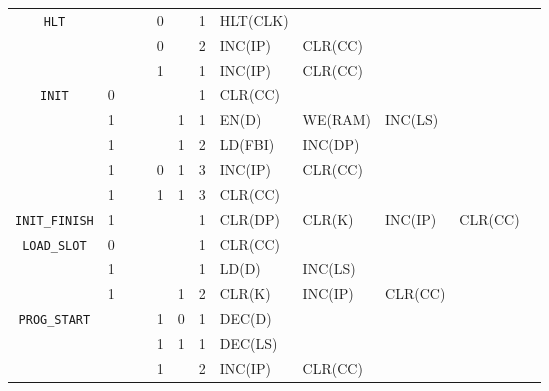 \begin{footnotesize}
\begin{longtable}[c] {c|ccccc|c|lllll}
    \rowcolor{Gray}  \texttt{HLT}   &   &   &   & 0 &   & 1  & HLT(CLK)    &           &           &        &                \\ 
    \rowcolor{Gray}                 &   &   &   & 0 &   & 2  & INC(IP)     &  CLR(CC)   &           &        &                \\ 
    \rowcolor{White}                &   &   &   & 1 &   & 1  & INC(IP)     &  CLR(CC)   &           &        &                \\ \hline        


    \rowcolor{Gray}  \texttt{INIT}  & 0 &   &   &   &   & 1  &  CLR(CC)     &           &           &        &               \\
    \rowcolor{White}                & 1 &   &   &   & 1 & 1  &  EN(D)      &  WE(RAM)  &  INC(LS)  &        &                \\
    \rowcolor{White}                & 1 &   &   &   & 1 & 2  &  LD(FBI)    &  INC(DP)          &   &        &                \\
    \rowcolor{White}                & 1 &   &   & 0 & 1 & 3  &  INC(IP)    &  CLR(CC)   &           &        &                \\
    \rowcolor{Gray}                 & 1 &   &   & 1 & 1 & 3  &  CLR(CC)     &           &           &        &                \\ \hline

    \rowcolor{Gray} \texttt{INIT\_FINISH}  & 1 &   &   &   &   & 1  &  CLR(DP)  & CLR(K) &  INC(IP)  & CLR(CC)   &                \\ \hline

    \rowcolor{Gray}  \texttt{LOAD\_SLOT}  & 0 &   &   &   &   & 1  &  CLR(CC)     &           &           &        &                \\
    \rowcolor{White}                      & 1 &   &   &   &   & 1  &  LD(D)      &  INC(LS)  &           &        &                \\
    \rowcolor{White}                      & 1 &   &   &   & 1 & 2  &  CLR(K)     &  INC(IP)  &  CLR(CC)   &        &                \\ \hline

    \rowcolor{Gray}  \texttt{PROG\_START} &   &   &   & 1 & 0 & 1  &  DEC(D)     &           &           &        &                \\ 
    \rowcolor{White}                      &   &   &   & 1 & 1 & 1  &  DEC(LS)    &           &           &        &               \\
    \rowcolor{Gray}                       &   &   &   & 1 &   & 2  &  INC(IP)    & CLR(CC)    &           &        &                \\ \hline


\end{longtable}
\end{footnotesize}
